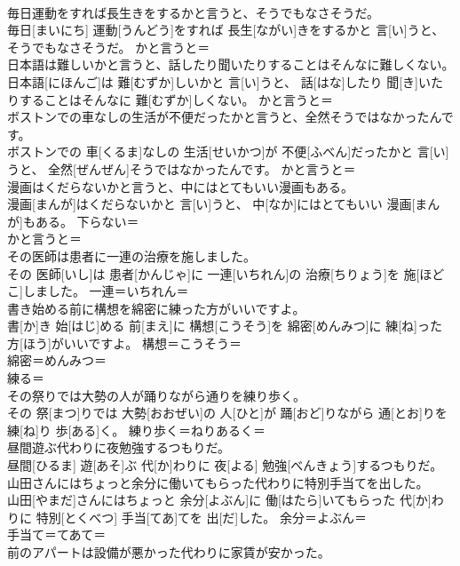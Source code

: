 \documentclass[8pt]{extreport}
\begin{document}
\begin{CJK}{UTF8}{min}
\\	毎日運動をすれば長生きをするかと言うと、そうでもなさそうだ。	
\\	毎日[まいにち] 運動[うんどう]をすれば 長生[ながい]きをするかと 言[い]うと、そうでもなさそうだ。	かと言うと＝ 
\\	日本語は難しいかと言うと、話したり聞いたりすることはそんなに難しくない。	
\\	日本語[にほんご]は 難[むずか]しいかと 言[い]うと、 話[はな]したり 聞[き]いたりすることはそんなに 難[むずか]しくない。	かと言うと＝ 
\\	ボストンでの車なしの生活が不便だったかと言うと、全然そうではなかったんです。	
\\	ボストンでの 車[くるま]なしの 生活[せいかつ]が 不便[ふべん]だったかと 言[い]うと、 全然[ぜんぜん]そうではなかったんです。	かと言うと＝ 
\\	漫画はくだらないかと言うと、中にはとてもいい漫画もある。	
\\	漫画[まんが]はくだらないかと 言[い]うと、 中[なか]にはとてもいい 漫画[まんが]もある。	下らない＝ 
\\	かと言うと＝ 
\\	その医師は患者に一連の治療を施しました。	
\\	その 医師[いし]は 患者[かんじゃ]に 一連[いちれん]の 治療[ちりょう]を 施[ほどこ]しました。	一連＝いちれん＝ 
\\	書き始める前に構想を綿密に練った方がいいですよ。	
\\	書[か]き 始[はじ]める 前[まえ]に 構想[こうそう]を 綿密[めんみつ]に 練[ね]った 方[ほう]がいいですよ。	構想＝こうそう＝ 
\\	綿密＝めんみつ＝ 
\\	練る＝ 
\\	その祭りでは大勢の人が踊りながら通りを練り歩く。	
\\	その 祭[まつ]りでは 大勢[おおぜい]の 人[ひと]が 踊[おど]りながら 通[とお]りを 練[ね]り 歩[ある]く。	練り歩く＝ねりあるく＝ 
\\	昼間遊ぶ代わりに夜勉強するつもりだ。	
\\	昼間[ひるま] 遊[あそ]ぶ 代[か]わりに 夜[よる] 勉強[べんきょう]するつもりだ。	
\\	山田さんにはちょっと余分に働いてもらった代わりに特別手当てを出した。	
\\	山田[やまだ]さんにはちょっと 余分[よぶん]に 働[はたら]いてもらった 代[か]わりに 特別[とくべつ] 手当[てあ]てを 出[だ]した。	余分＝よぶん＝ 
\\	手当て＝てあて＝ 
\\	前のアパートは設備が悪かった代わりに家賃が安かった。	

\end{CJK}
\end{document}
